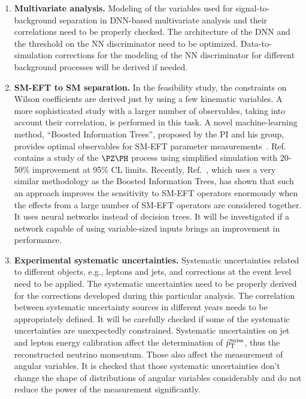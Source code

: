 \documentclass[a4paper,11pt]{article}
\begin{document}
\begin{enumerate}[noitemsep,topsep=0pt]
\item {\bf Multivariate analysis.} Modeling of the variables used for signal-to-background separation in DNN-based multivariate analysis and their correlations need to be properly checked. 
The architecture of the DNN and the threshold on the NN discriminator need to be optimized. 
Data-to-simulation corrections for the modeling of the NN discriminator for different background processes will be derived if needed. 

\item {\bf SM-EFT to SM separation.} In the feasibility study, the constraints on Wilson coefficients are derived just by using a few kinematic variables.
A more sophisticated study with a larger number of observables, taking into account their correlation, is performed in this task. 
A novel machine-learning method, ``Boosted Information Trees'', proposed by the PI and his group, provides optimal observables for SM-EFT parameter measurements~\cite{Chatterjee:2021nms,Chatterjee:2022oco}. 
Ref.~\cite{Chatterjee:2022oco} contains a study of the $\PZ\PH$ process using simplified simulation with 20-50\% improvement at 95\% CL limits.
Recently, Ref.~\cite{GomezAmbrosio:2022mpm}, which uses a very similar methodology as the Boosted Information Trees, has shown that such an approach improves the sensitivity to SM-EFT operators enormously when the effects from a large number of SM-EFT operators are considered together. 
It uses neural networks instead of decision trees. 
It will be investigated if a network capable of using variable-sized inputs brings an improvement in performance.

\item {\bf Experimental systematic uncertainties.} Systematic uncertainties related to different objects, e.g., leptons and jets, and corrections at the event level need to be applied. 
The systematic uncertainties need to be properly derived for the corrections developed during this particular analysis. 
The correlation between systematic uncertainty sources in different years needs to be appropriately defined. 
It will be carefully checked if some of the systematic uncertainties are unexpectedly constrained. 
Systematic uncertainties on jet and lepton energy calibration affect the determination of ${\vec p}_{\mathrm{T}}^{\kern1pt\text{miss}}$, thus the reconstructed neutrino momentum. Those also affect the measurement of angular variables. It is checked that those systematic uncertainties don't change the shape of distributions of angular variables considerably and do not reduce the power of the measurement significantly.


\end{enumerate}
\end{document}
